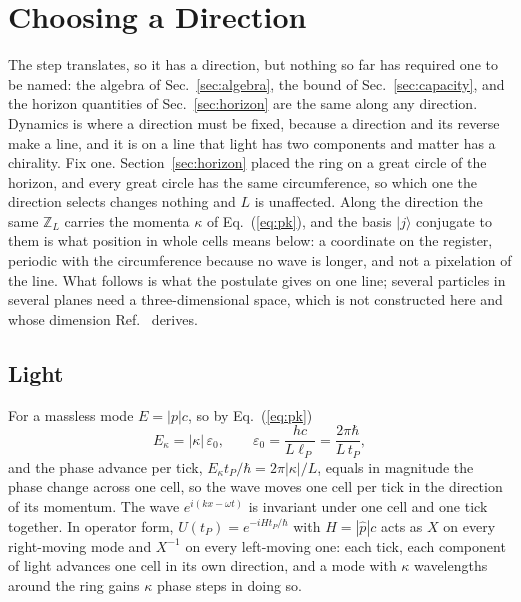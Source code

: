 \documentclass[aps,prd,twocolumn,superscriptaddress,nofootinbib]{revtex4-2}
\begin{document}
\section{Choosing a Direction}
\label{sec:direction}

The step translates, so it has a direction, but nothing so far has required one to be named: the algebra of Sec.~\ref{sec:algebra}, the bound of Sec.~\ref{sec:capacity}, and the horizon quantities of Sec.~\ref{sec:horizon} are the same along any direction. Dynamics is where a direction must be fixed, because a direction and its reverse make a line, and it is on a line that light has two components and matter has a chirality. Fix one. Section~\ref{sec:horizon} placed the ring on a great circle of the horizon, and every great circle has the same circumference, so which one the direction selects changes nothing and $L$ is unaffected. Along the direction the same $\mathbb{Z}_L$ carries the momenta $\kappa$ of Eq.~(\ref{eq:pk}), and the basis $|j\rangle$ conjugate to them is what position in whole cells means below: a coordinate on the register, periodic with the circumference because no wave is longer, and not a pixelation of the line. What follows is what the postulate gives on one line; several particles in several planes need a three-dimensional space, which is not constructed here and whose dimension Ref.~\cite{korytko2026d} derives.

\subsection{Light}
\label{sec:light}

For a massless mode $E = |p|c$, so by Eq.~(\ref{eq:pk})
\begin{equation}
E_\kappa = |\kappa|\,\varepsilon_0, \qquad \varepsilon_0 = \frac{hc}{L\ell_P} = \frac{2\pi\hbar}{L\,t_P},
\label{eq:eps0}
\end{equation}
and the phase advance per tick, $E_\kappa t_P/\hbar = 2\pi|\kappa|/L$, equals in magnitude the phase change across one cell, so the wave moves one cell per tick in the direction of its momentum. The wave $e^{i(kx-\omega t)}$ is invariant under one cell and one tick together. In operator form, $U(t_P) = e^{-iHt_P/\hbar}$ with $H = |\hat p|c$ acts as $X$ on every right-moving mode and $X^{-1}$ on every left-moving one: each tick, each component of light advances one cell in its own direction, and a mode with $\kappa$ wavelengths around the ring gains $\kappa$ phase steps in doing so.
\end{document}

